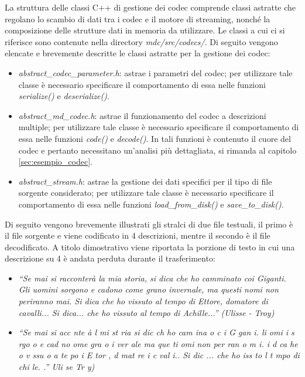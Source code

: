 La struttura delle classi C++ di gestione dei codec comprende classi astratte
che regolano lo scambio di dati tra i codec e il motore di streaming, nonché la
composizione delle strutture dati in memoria da utilizzare. Le classi a cui ci si riferisce sono contenute nella directory \textit{mdc/src/codecs/}. Di
seguito vengono elencate e brevemente descritte le classi astratte per la
gestione dei codec:
\begin{itemize}
 \item \textit{abstract\_codec\_parameter.h}: astrae i parametri del codec; per
 utilizzare tale classe è necessario specificare il comportamento di essa nelle
 funzioni \textit{serialize()} e \textit{deserialize()}.
 \item \textit{abstract\_md\_codec.h}: astrae il funzionamento del codec a
 descrizioni multiple; per utilizzare tale classe è necessario specificare il
 comportamento di essa nelle funzioni \textit{code()} e \textit{decode()}. In
 tali funzioni è contenuto il cuore del codec e pertanto necessitano un'analisi
 più dettagliata, si rimanda al capitolo \ref{sec:esempio_codec}.
 \item \textit{abstract\_stream.h}: astrae la gestione dei dati specifici per il
 tipo di file sorgente considerato; per utilizzare tale classe è necessario
 specificare il comportamento di essa nelle funzioni \textit{load\_from\_disk()}
 e \textit{save\_to\_disk()}.
\end{itemize}

Di seguito vengono brevemente illustrati gli stralci di due file
testuali, il primo è il file sorgente e viene codificato in 4 descrizioni,
mentre il secondo è il file decodificato. A titolo dimostrativo viene riportata
la porzione di testo in cui una descrizione su 4 è andata perduta durante il
trasferimento:

\begin{itemize}
  \item \emph{``Se mai si racconterà la mia storia, si dica che ho camminato
  coi Giganti. Gli uomini sorgono e cadono come grano invernale, ma questi nomi non periranno mai. Si dica che ho vissuto al tempo di Ettore, domatore di cavalli... Si dica... che ho vissuto al tempo di Achille...'' (Ulisse - Troy)}
  \item \emph{``Se mai si  acc nte à l  mi  st ria  si dic  ch  ho cam ina o c
  i G gan i.  li  omi i s rgo o e cad no  ome gra o i ver ale  ma que ti  omi  
  non per ran o m i.  i d ca  he  o v ssu o a  te po  i E tor , d mat re  i
  c val i..  Si dic ... che ho  iss to  l t mpo di  chi le. .''  Uli se   Tr y)}
\end{itemize}


